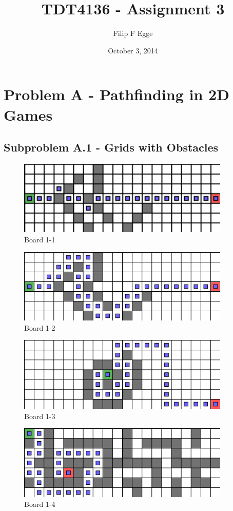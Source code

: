 \documentclass{article}
\begin{document}
\title{TDT4136 - Assignment 3}
\author{Filip F Egge}
\date{October 3, 2014}
\maketitle

\newpage
\section*{Problem A - Pathfinding in 2D Games}
\subsection*{Subproblem A.1 - Grids with Obstacles}
	\FloatBarrier
	\begin{figure}[!htb]
		\caption{Board 1-1}
		\includegraphics[width=0.9\textwidth]{img1.png}
	\end{figure}

	\begin{figure}[!htb]
		\caption{Board 1-2}
		\includegraphics[width=0.9\textwidth]{img2.png}
	\end{figure}
	\begin{figure}[!htb]
		\caption{Board 1-3}
		\includegraphics[width=0.9\textwidth]{img3.png}
	\end{figure}
	\begin{figure}[!htb]
		\caption{Board 1-4}
		\includegraphics[width=0.9\textwidth]{img4.png}
	\end{figure}
\FloatBarrier
\end{document}
